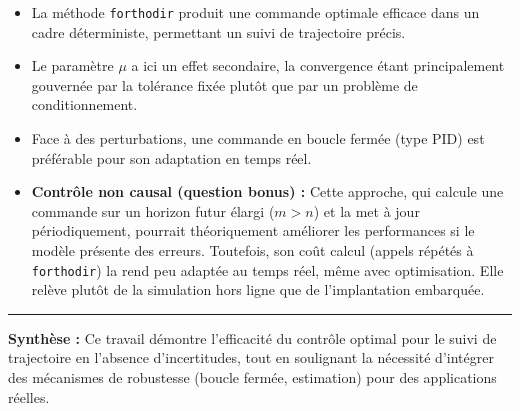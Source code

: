\documentclass[12pt,a4paper]{article}
\begin{document}
\begin{itemize}
    \item La méthode \texttt{forthodir} produit une commande optimale efficace dans un cadre déterministe, permettant un suivi de trajectoire précis.
    
    \item Le paramètre \( \mu \) a ici un effet secondaire, la convergence étant principalement gouvernée par la tolérance fixée plutôt que par un problème de conditionnement.
    
    \item Face à des perturbations, une commande en boucle fermée (type PID) est préférable pour son adaptation en temps réel.
    
    \item \textbf{Contrôle non causal (question bonus) :} Cette approche, qui calcule une commande sur un horizon futur élargi (\( m > n \)) et la met à jour périodiquement, pourrait théoriquement améliorer les performances si le modèle présente des erreurs. Toutefois, son coût calcul (appels répétés à \texttt{forthodir}) la rend peu adaptée au temps réel, même avec optimisation. Elle relève plutôt de la simulation hors ligne que de l'implantation embarquée.
\end{itemize}

\vspace{1em}
\noindent\rule{\textwidth}{0.5pt}
\vspace{0.5em}

\noindent\textbf{Synthèse :} Ce travail démontre l'efficacité du contrôle optimal pour le suivi de trajectoire en l'absence d'incertitudes, tout en soulignant la nécessité d'intégrer des mécanismes de robustesse (boucle fermée, estimation) pour des applications réelles.
\end{document}
